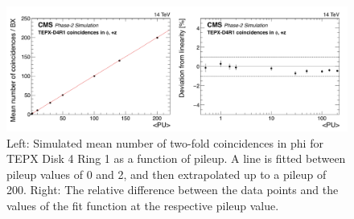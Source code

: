 \begin{figure}[H]
  \centering
  \includegraphics[width=1\columnwidth]{ashish_thesis/michigan_4.png}
  \caption[TEPX two-fold coincidences fit And residuals]{\onehalfspacing Left: Simulated mean number of two-fold coincidences in phi for TEPX Disk 4 Ring 1 as a function of pileup. A line is fitted between pileup values of 0 and 2, and then extrapolated up to a pileup of 200. Right: The relative difference between the data points and the values of the fit function at the respective pileup value.}
  \label{fig:CMS_4207}
\end{figure}



